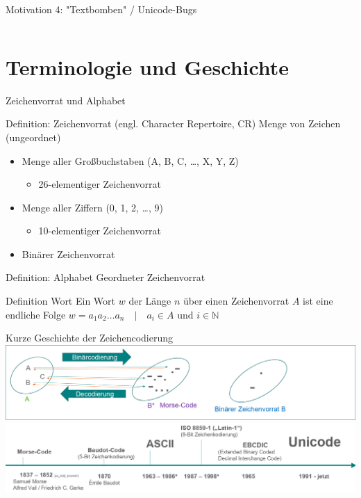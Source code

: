 \documentclass[xelatex,aspectratio=169]{beamer}
\begin{document}
\begin{frame}{Motivation 4: "Textbomben" / Unicode-Bugs}
\begin{columns}
\begin{column}{0.5\textwidth}
        \end{column}
    \end{columns}
\end{frame}

\section{Terminologie und Geschichte}

\begin{frame}{Zeichenvorrat und Alphabet}
    \begin{block}{Definition: Zeichenvorrat (engl. Character Repertoire, CR)}
        Menge von Zeichen (ungeordnet)
        \begin{itemize}
            \item Menge aller Großbuchstaben (A, B, C, \dots, X, Y, Z)
                  \begin{itemize}
                      \item 26-elementiger Zeichenvorrat
                  \end{itemize}
            \item Menge aller Ziffern (0, 1, 2, \dots, 9)
                  \begin{itemize}
                      \item 10-elementiger Zeichenvorrat
                  \end{itemize}
            \item Binärer Zeichenvorrat
        \end{itemize}
    \end{block}
    \begin{block}{Definition: Alphabet}
        Geordneter Zeichenvorrat
    \end{block}
    \begin{block}{Definition Wort}
        Ein Wort $w$ der Länge $n$ über einen Zeichenvorrat $A$ ist eine endliche Folge $w = a_1 a_2 \ldots a_n \quad \vert \quad a_i \in A \mbox{ und } i \in \mathbb{N}$
    \end{block}
\end{frame}


\begin{frame}{Kurze Geschichte der Zeichencodierung}
    \includegraphics[width=\textwidth]{img/codierung_morsecode.png}
    \includegraphics[width=\textwidth]{img/codierung_zeitstrahl.png}
\end{frame}
\end{document}
